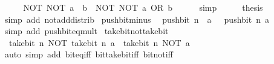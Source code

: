 \begin{isabellebody}
\ \ \isamarkupfalse%
\ \isamarkupfalse%
\ {\isacartoucheopen}NOT\ {\isacharparenleft}{\kern0pt}NOT\ a\ {\isacharplus}{\kern0pt}\ b{\isacharparenright}{\kern0pt}\ {\isacharequal}{\kern0pt}\ NOT\ {\isacharparenleft}{\kern0pt}NOT\ a\ OR\ b{\isacharparenright}{\kern0pt}{\isacartoucheclose}\isanewline
\ \ \ \ \isamarkupfalse%
\ simp\isanewline
\ \ \isamarkupfalse%
\ \isamarkupfalse%
\ {\isacharquery}{\kern0pt}thesis\isanewline
\ \ \ \ \isamarkupfalse%
\ {\isacharparenleft}{\kern0pt}simp\ add{\isacharcolon}{\kern0pt}\ not{\isacharunderscore}{\kern0pt}add{\isacharunderscore}{\kern0pt}distrib{\isacharparenright}{\kern0pt}\isanewline
{}\isamarkupfalse%
%
\endisatagproof
{\isafoldproof}%
%
\isadelimproof
\isanewline
%
\endisadelimproof
\isanewline
{}\isamarkupfalse%
\ push{\isacharunderscore}{\kern0pt}bit{\isacharunderscore}{\kern0pt}minus{\isacharcolon}{\kern0pt}\isanewline
\ \ {\isacartoucheopen}push{\isacharunderscore}{\kern0pt}bit\ n\ {\isacharparenleft}{\kern0pt}{\isacharminus}{\kern0pt}\ a{\isacharparenright}{\kern0pt}\ {\isacharequal}{\kern0pt}\ {\isacharminus}{\kern0pt}\ push{\isacharunderscore}{\kern0pt}bit\ n\ a{\isacartoucheclose}\isanewline
%
\isadelimproof
\ \ %
\endisadelimproof
%
\isatagproof
{}\isamarkupfalse%
\ {\isacharparenleft}{\kern0pt}simp\ add{\isacharcolon}{\kern0pt}\ push{\isacharunderscore}{\kern0pt}bit{\isacharunderscore}{\kern0pt}eq{\isacharunderscore}{\kern0pt}mult{\isacharparenright}{\kern0pt}%
\endisatagproof
{\isafoldproof}%
%
\isadelimproof
\isanewline
%
\endisadelimproof
\isanewline
{}\isamarkupfalse%
\ take{\isacharunderscore}{\kern0pt}bit{\isacharunderscore}{\kern0pt}not{\isacharunderscore}{\kern0pt}take{\isacharunderscore}{\kern0pt}bit{\isacharcolon}{\kern0pt}\isanewline
\ \ {\isacartoucheopen}take{\isacharunderscore}{\kern0pt}bit\ n\ {\isacharparenleft}{\kern0pt}NOT\ {\isacharparenleft}{\kern0pt}take{\isacharunderscore}{\kern0pt}bit\ n\ a{\isacharparenright}{\kern0pt}{\isacharparenright}{\kern0pt}\ {\isacharequal}{\kern0pt}\ take{\isacharunderscore}{\kern0pt}bit\ n\ {\isacharparenleft}{\kern0pt}NOT\ a{\isacharparenright}{\kern0pt}{\isacartoucheclose}\isanewline
%
\isadelimproof
\ \ %
\endisadelimproof
%
\isatagproof
{}\isamarkupfalse%
\ {\isacharparenleft}{\kern0pt}auto\ simp\ add{\isacharcolon}{\kern0pt}\ bit{\isacharunderscore}{\kern0pt}eq{\isacharunderscore}{\kern0pt}iff\ bit{\isacharunderscore}{\kern0pt}take{\isacharunderscore}{\kern0pt}bit{\isacharunderscore}{\kern0pt}iff\ bit{\isacharunderscore}{\kern0pt}not{\isacharunderscore}{\kern0pt}iff{\isacharparenright}{\kern0pt}%

\end{isabellebody}

